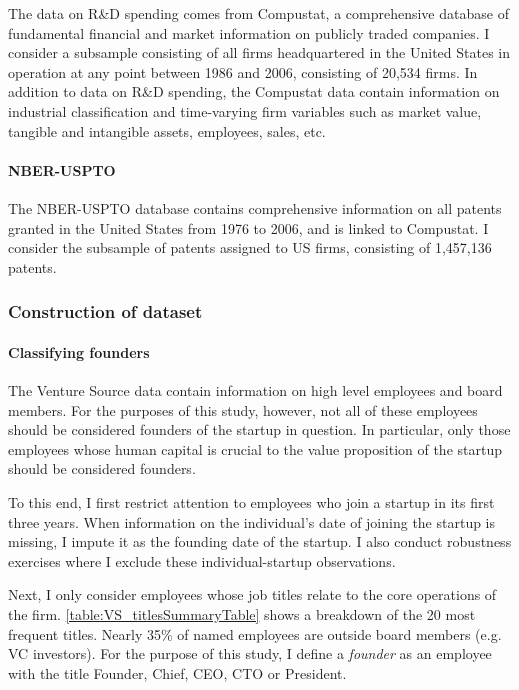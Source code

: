 \documentclass[11pt,english]{article}
\begin{document}
The data on R\&D spending comes from Compustat, a comprehensive database of fundamental financial and market information on publicly traded companies. I consider a subsample consisting of all firms headquartered in the United States in operation at any point between 1986 and 2006, consisting of 20,534 firms. In addition to data on R\&D spending, the Compustat data contain information on industrial classification and time-varying firm variables such as market value, tangible and intangible assets, employees, sales, etc.

\paragraph{NBER-USPTO}

The NBER-USPTO database contains comprehensive information on all patents granted in the United States from 1976 to 2006, and is linked to Compustat. I consider the subsample of patents assigned to US firms, consisting of 1,457,136 patents. 

\subsubsection{Construction of dataset}

\paragraph{Classifying founders}

The Venture Source data contain information on high level employees and board members. For the purposes of this study, however, not all of these employees should be considered founders of the startup in question. In particular, only those employees whose human capital is crucial to the value proposition of the startup should be considered founders. 

To this end, I first restrict attention to employees who join a startup in its first three years. When information on the individual's date of joining the startup is missing, I impute it as the founding date of the startup. I also conduct robustness exercises where I exclude these individual-startup observations. 

Next, I only consider employees whose job titles relate to the core operations of the firm. \autoref{table:VS_titlesSummaryTable} shows a breakdown of the 20 most frequent titles. Nearly 35\% of named employees are outside board members (e.g. VC investors). For the purpose of this study, I define a \textit{founder} as an employee with the title Founder, Chief, CEO, CTO or President. 
\end{document}

